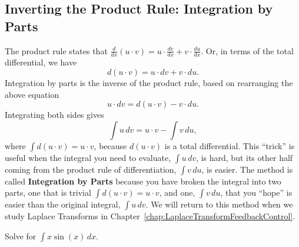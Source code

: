 \begin{center}
\setlength{\fboxrule}{2pt}  %
\end{center}


\subsection{Inverting the Product Rule: Integration by Parts}
The product rule states that \( \frac{d}{dx}(u \cdot v) = u \cdot \frac{dv}{dx} + v\cdot \frac{du}{dx} \). Or, in terms of the total differential, we have
$$ d (u \cdot v) = u \cdot dv + v \cdot du. $$
Integration by parts is the inverse of the product rule, based on rearranging the above equation  
$$ u \cdot dv = d (u \cdot v)  - v \cdot du. $$
Integrating both sides gives
\begin{equation}
    \int u \, dv = u\cdot v - \int v \, du,
\end{equation}
where $\int d (u \cdot v) = u \cdot v$, because $ d (u \cdot v)$ is a total differential. This ``trick'' is useful when the integral you need to evaluate, $ \int u \, dv$, is hard, but its other half coming from the product rule of differentiation, $\int v \, du$, is easier. The method is called \textbf{Integration by Parts} because you have broken the integral into two parts, one that is trivial $\int d (u \cdot v) = u \cdot v$, and one, $\int v \, du$, that you ``hope'' is easier than the original integral, $ \int u \, dv $. We will return to this method when we study Laplace Transforms in Chapter~\ref{chap:LaplaceTransformFeedbackControl}.

\bigskip

\begin{example} 
\label{ex:xsinofx}
Solve for \( \int x \sin(x) \, dx \).     
\end{example}

